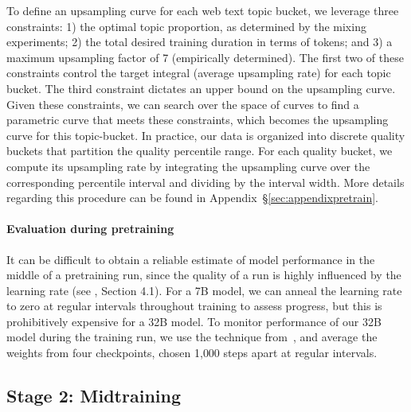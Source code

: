 \documentclass[table]{ai2style/ai2}
\begin{document}
To define an upsampling curve for each web text topic bucket, we leverage three constraints: 1) the optimal topic proportion, as determined by the mixing experiments; 2) the total desired training duration in terms of tokens; and 3) a maximum upsampling factor of 7 (empirically determined). The first two of these constraints control the target integral (average upsampling rate) for each topic bucket. The third constraint dictates an upper bound on the upsampling curve. Given these constraints, we can search over the space of curves to find a parametric curve that meets these constraints, which becomes the upsampling curve for this topic-bucket. In practice, our data is organized into discrete quality buckets that partition the quality percentile range. For each quality bucket, we compute its upsampling rate by integrating the upsampling curve over the corresponding percentile interval and dividing by the interval width. More details regarding this procedure can be found in Appendix~\S\ref{sec:appendixpretrain}.

\paragraph{Evaluation during pretraining}
\label{sec:eval:duringpretraining}

It can be difficult to obtain a reliable estimate of model performance in the middle of a pretraining run, since the quality of a run is highly influenced by the learning rate (see \cite{olmo20242olmo2furious}, Section 4.1).
For a 7B model, we can anneal the learning rate to zero at regular intervals throughout training to assess progress, but this is prohibitively expensive for a 32B model.
To monitor performance of our 32B model during the training run, we use the technique from~\cite{modelmerginginpretraining}, and average the weights from four checkpoints, chosen 1{,}000 steps apart at regular intervals.

\subsection{Stage 2: Midtraining}\label{sec:midtraining}
\end{document}
